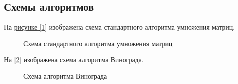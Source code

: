 \documentclass{article}
\begin{document}
	 	\subsection{Схемы алгоритмов}
	 	На \hyperref[Algorithm1]{рисунке [\ref{Algorithm1}]} изображена схема стандартного алгоритма умножения матриц.
	\begin{figure}[h!]
		\caption{Схема стандартного алгоритма умножения матриц}
		\label{Algorithm1}
	\end{figure}
	\newpage
	На \hyperref[Algorithm2]{ [\ref{Algorithm2}]} изображена схема алгоритма Винограда.
	\begin{figure}[h!]
		\caption{Схема алгоритма Винограда}
		\label{Algorithm2}
	\end{figure}
\end{document}
